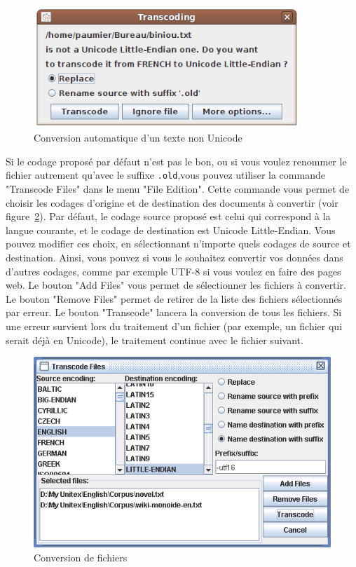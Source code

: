\begin{figure}[!ht]
\begin{center}
\includegraphics[width=10cm]{resources/img/fig2-2.png}
\caption{\label{auto-transcoding}Conversion automatique d’un texte non Unicode}
\end{center}
\end{figure}

\bigskip
\noindent Si le codage proposé par défaut n’est pas le bon, ou si vous voulez renommer le fichier
autrement qu’avec le suffixe \verb$.old$,vous pouvez utiliser la commande "Transcode Files"
dans le menu "File Edition". Cette commande vous permet de choisir les codages d’origine
et de destination des documents à convertir (voir figure~\ref{transcoding}). Par défaut, le codage
source proposé est celui qui correspond à la langue courante, et le codage de destination est
Unicode Little-Endian. Vous pouvez modifier ces choix, en sélectionnant n’importe quels
codages de source et destination. Ainsi, vous pouvez si vous le souhaitez convertir vos données
dans d’autres codages, comme par exemple UTF-8 si vous voulez en faire des pages
web. Le bouton "Add Files" vous permet de sélectionner les fichiers à convertir. Le bouton
"Remove Files" permet de retirer de la liste des fichiers sélectionnés par erreur. Le bouton
"Transcode" lancera la conversion de tous les fichiers. Si une erreur survient lors du traitement
d’un fichier (par exemple, un fichier qui serait déjà en Unicode), le traitement continue
avec le fichier suivant.


\begin{figure}[!ht]
\begin{center}
\includegraphics[width=12cm]{resources/img/fig2-3.png}
\caption{\label{transcoding}Conversion de fichiers}
\end{center}
\end{figure}

